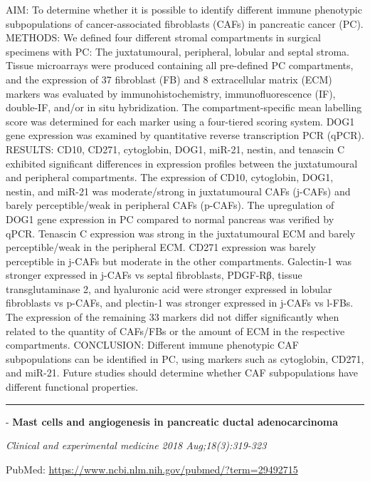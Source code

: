 \documentclass[]{article}
\begin{document}
AIM: To determine whether it is possible to identify different immune
phenotypic subpopulations of cancer-associated fibroblasts (CAFs) in
pancreatic cancer (PC). METHODS: We defined four different stromal
compartments in surgical specimens with PC: The juxtatumoural,
peripheral, lobular and septal stroma. Tissue microarrays were produced
containing all pre-defined PC compartments, and the expression of 37
fibroblast (FB) and 8 extracellular matrix (ECM) markers was evaluated
by immunohistochemistry, immunofluorescence (IF), double-IF, and/or in
situ hybridization. The compartment-specific mean labelling score was
determined for each marker using a four-tiered scoring system. DOG1 gene
expression was examined by quantitative reverse transcription PCR
(qPCR). RESULTS: CD10, CD271, cytoglobin, DOG1, miR-21, nestin, and
tenascin C exhibited significant differences in expression profiles
between the juxtatumoural and peripheral compartments. The expression of
CD10, cytoglobin, DOG1, nestin, and miR-21 was moderate/strong in
juxtatumoural CAFs (j-CAFs) and barely perceptible/weak in peripheral
CAFs (p-CAFs). The upregulation of DOG1 gene expression in PC compared
to normal pancreas was verified by qPCR. Tenascin C expression was
strong in the juxtatumoural ECM and barely perceptible/weak in the
peripheral ECM. CD271 expression was barely perceptible in j-CAFs but
moderate in the other compartments. Galectin-1 was stronger expressed in
j-CAFs vs septal fibroblasts, PDGF-Rβ, tissue transglutaminase 2, and
hyaluronic acid were stronger expressed in lobular fibroblasts vs
p-CAFs, and plectin-1 was stronger expressed in j-CAFs vs l-FBs. The
expression of the remaining 33 markers did not differ significantly when
related to the quantity of CAFs/FBs or the amount of ECM in the
respective compartments. CONCLUSION: Different immune phenotypic CAF
subpopulations can be identified in PC, using markers such as
cytoglobin, CD271, and miR-21. Future studies should determine whether
CAF subpopulations have different functional properties.

{}

{}

\begin{center}\rule{0.5\linewidth}{\linethickness}\end{center}

 - \textbf{Mast cells and angiogenesis in pancreatic ductal
adenocarcinoma}

\emph{Clinical and experimental medicine 2018 Aug;18(3):319-323}

PubMed: \url{https://www.ncbi.nlm.nih.gov/pubmed/?term=29492715}
\end{document}
